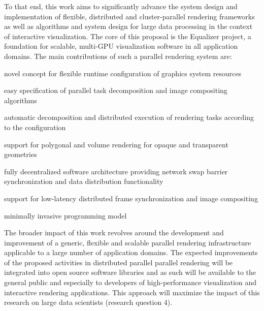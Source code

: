 To that end, this work aims to significantly advance the system design and
implementation of flexible, distributed and cluster-parallel rendering
frameworks as well as algorithms and system design for large data processing in
the context of interactive visualization. The core of this proposal is the
Equalizer project, a foundation for scalable, multi-GPU visualization software
in all application domains. The main contributions of such a parallel rendering
system are:
%
\begin{compactenum}
\item novel concept for flexible runtime configuration of graphics system resources
\item easy specification of parallel task decomposition and image compositing algorithms
\item automatic decomposition and distributed execution of rendering tasks according to the configuration
\item support for polygonal and volume rendering for opaque and transparent geometries
\item fully decentralized software architecture providing network swap barrier synchronization and data distribution functionality
\item support for low-latency distributed frame synchronization and image compositing
\item minimally invasive programming model
\end{compactenum}

The broader impact of this work revolves around the development and improvement
of a generic, flexible and scalable parallel rendering infrastructure applicable
to a large number of application domains. The expected improvements of the
proposed activities in distributed parallel parallel rendering will be
integrated into open source software libraries and as such will be available to
the general public and especially to developers of high-performance
visualization and interactive rendering applications. This approach will
maximize the impact of this research on large data scientists (research question
4).

